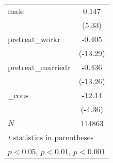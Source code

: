{\begin{tabular}{l*{1}{c}}
male        &       0.147\sym{***}\\
            &      (5.33)         \\
[1em]
pretreat\_workr&      -0.405\sym{***}\\
            &    (-13.29)         \\
[1em]
pretreat\_marriedr&      -0.436\sym{***}\\
            &    (-13.26)         \\
[1em]
\_cons      &      -12.14\sym{***}\\
            &     (-4.36)         \\
\hline
\(N\)       &      114863         \\
\hline\hline
\multicolumn{2}{l}{\footnotesize \textit{t} statistics in parentheses}\\
\multicolumn{2}{l}{\footnotesize \sym{*} \(p<0.05\), \sym{**} \(p<0.01\), \sym{***} \(p<0.001\)}\\
\end{tabular}
}
